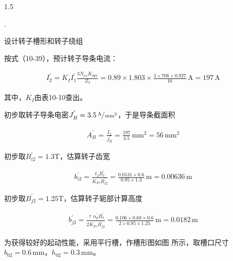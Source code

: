 \documentclass[a4paper,11pt]{ctexart}
\newcommand{\A}{\,\text{A}}
\newcommand{\m}{\,\text{m}}
\newcommand{\mm}{\,\text{mm}}
\newcommand{\T}{\text{T}}
\newenvironment{shrinkeq}[2]
{
	\bgroup
	\addtolength\abovedisplayshortskip{#1}
	\addtolength\abovedisplayskip{#1}
	\addtolength\belowdisplayshortskip{#2}
	\addtolength\belowdisplayskip{#2}
}
{
	\egroup
	\ignorespacesafterend
}
\newcounter{designitem}
\newcommand{\entry}
{
	\vspace{0.5em}
	\par
	\stepcounter{designitem}
	\thedesignitem.
}
\begin{document}
\begin{spacing}{1.5}
\entry
设计转子槽形和转子绕组
\par
按式（10-39），预计转子导条电流：
\begin{shrinkeq}{-1ex}{-1ex}
	\begin{align}
	I_{2}^{'} = K_{I}I_{1}^{'}\frac{3N_{\phi 1}K_{dp1}}{Z_2} =0.89\times 1.803\times \frac{3\times 708\times 0.927}{16}\A = 197\A
	\end{align}
\end{shrinkeq}
其中，$K_{I}$由表10-10查出。
\par
初步取转子导条电密$J_{B}^{'} = 3.5\sfrac{\A}{\mm^2}$，于是导条截面积
\begin{shrinkeq}{-1ex}{-1ex}
	\begin{align}
	A_{B}^{'}=\frac{I_{2}^{'}}{J_{B}^{'}} = \frac{197}{3.5}\mm^2 = 56\mm^2
	\end{align}
\end{shrinkeq}
\par
初步取$B_{i2}^{'} = 1.3\T$，估算转子齿宽
\begin{shrinkeq}{-1ex}{-1ex}
	\begin{align}
	b_{i2}^{'} = \frac{t_2B_{\delta}^{'}}{K_{Fe}B_{i2}^{'}}=\frac{0.0131\times 0.6}{0.95\times 1.3}\m = 0.00636\m
	\end{align}
\end{shrinkeq}
初步取$B_{j2}^{'} = 1.25\T$，估算转子轭部计算高度
\begin{shrinkeq}{-1ex}{-1ex}
	\begin{align}
	b_{j2}^{'} = \frac{\uptau \alpha_{p}^{'}B_{\delta}^{'}}{2K_{Fe}B_{j2}^{'}}=\frac{0.106\times 0.68\times 0.6}{2\times 0.95\times 1.25}\m = 0.0182\m
	\end{align}
\end{shrinkeq}
为获得较好的起动性能，采用平行槽，作槽形图如图 所示，取槽口尺寸$b_{02} = 0.6\mm$，$h_{02} = 0.3\mm$。


\end{spacing}
\end{document}
